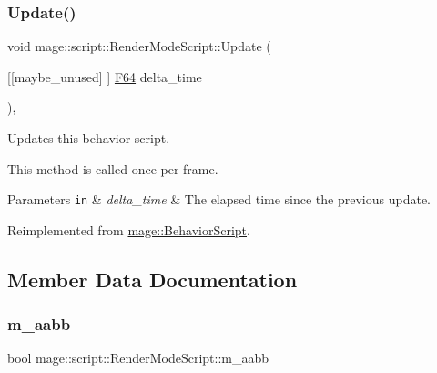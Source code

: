 \hypertarget{classmage_1_1script_1_1_render_mode_script_afe0bfc54c414c2697dfd2babaccf3b51}{}\label{classmage_1_1script_1_1_render_mode_script_afe0bfc54c414c2697dfd2babaccf3b51} 
\subsubsection{\texorpdfstring{Update()}{Update()}}
{\footnotesize\ttfamily void mage\+::script\+::\+Render\+Mode\+Script\+::\+Update (\begin{DoxyParamCaption}\item[{\mbox{[}\mbox{[}maybe\+\_\+unused\mbox{]} \mbox{]} \hyperlink{namespacemage_ad26233bbec640deda836e572c1a23708}{F64}}]{delta\+\_\+time }\end{DoxyParamCaption})\hspace{0.3cm}{\ttfamily [override]}, {\ttfamily [virtual]}}

Updates this behavior script.

This method is called once per frame.


\begin{DoxyParams}[1]{Parameters}
\mbox{\tt in}  & {\em delta\+\_\+time} & The elapsed time since the previous update. \\
\hline
\end{DoxyParams}


Reimplemented from \hyperlink{classmage_1_1_behavior_script_afb9cf3759edf8876416d1df85489cba6}{mage\+::\+Behavior\+Script}.



\subsection{Member Data Documentation}
\hypertarget{classmage_1_1script_1_1_render_mode_script_a6b8036624a534f1107ff38744d38f606}{}\label{classmage_1_1script_1_1_render_mode_script_a6b8036624a534f1107ff38744d38f606} 
\subsubsection{\texorpdfstring{m\+\_\+aabb}{m\_aabb}}
{\footnotesize\ttfamily bool mage\+::script\+::\+Render\+Mode\+Script\+::m\+\_\+aabb\hspace{0.3cm}{\ttfamily [private]}}

